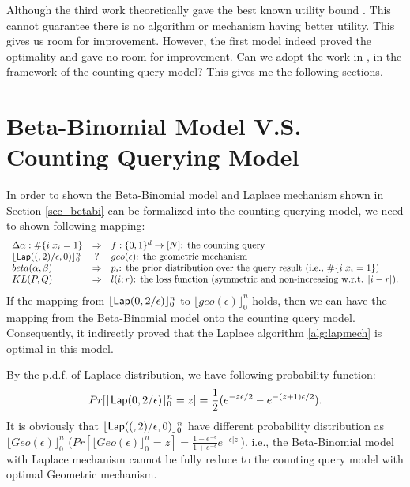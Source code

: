 \documentclass{article}
\begin{document}
Although the third work theoretically gave the best known utility bound \cite{zhang2016differential}.
This cannot guarantee there is no algorithm or mechanism having better utility.
This gives us room for improvement. 
%
However, the first model indeed proved the optimality and gave no room for improvement.
%
Can we adopt the work in \cite{bernstein2019differentially}, \cite{zhang2016differential}
in the framework of the counting query model?
This gives me the following sections.

%

\section{Beta-Binomial Model V.S. Counting Querying Model}
In order to shown the Beta-Binomial model and Laplace mechanism shown in Section \ref{sec_betabi} can be 
formalized into the counting querying model, we need to shown following mapping:
\[
	\begin{array}{lcl}
	\Delta \alpha : \#\{i |x_i = 1\}
	& \Rightarrow &
	f:\{0, 1\}^d \rightarrow [N] \mbox{: the counting query}\\
	\lfloor \mathsf{Lap}((, 2)/\epsilon, 0) \rfloor_0^{n}
	& ? &
	geo(\epsilon) \mbox{: the geometric mechanism}\\
	beta(\alpha, \beta)
	& \Rightarrow &
	p_{i} \mbox{: the prior distribution over the query result (i.e., $\#\{i |x_i = 1\}$) }\\
	KL(P, Q)
	& \Rightarrow &
	l(i; r) \mbox{: the loss function (symmetric and non-increasing w.r.t. $|i - r|$).}
	\end{array}
\]
If the mapping from $\lfloor \mathsf{Lap}(0, 2/\epsilon) \rfloor_0^{n}$ to $\lfloor geo(\epsilon) \rfloor_0^{n}$ holds,
then we can have the mapping from the Beta-Binomial model onto the counting query model.
Consequently, 
it indirectly proved that the Laplace algorithm \ref{alg:lapmech} is optimal in this model.

By the p.d.f. of Laplace distribution, we have following probability function:
\[
	Pr[\lfloor \mathsf{Lap}(0, 2/\epsilon) \rfloor_0^{n} = z]
	= \frac{1}{2}(e^{-z\epsilon /2} - e^{-(z + 1)\epsilon / 2}).
\]
It is obviously that $\lfloor \mathsf{Lap}((, 2)/\epsilon, 0) \rfloor_0^{n}$ have different probability distribution as $\lfloor Geo(\epsilon) \rfloor_0^{n}$ 
($Pr[\lfloor Geo(\epsilon) \rfloor_0^{n} = z] = 
\frac{1 - e^{-\epsilon}}{1 + e^{-\epsilon}} e^{-\epsilon|z|}$).
i.e., the Beta-Binomial model with Laplace mechanism cannot be fully reduce to the counting query model 
with optimal Geometric mechanism.
\end{document}
